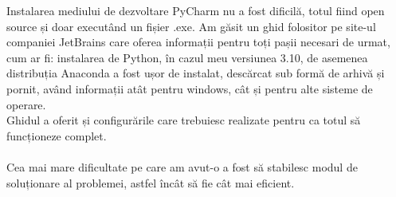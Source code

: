 \documentclass{article}
\begin{document}
Instalarea mediului de dezvoltare PyCharm nu a fost dificilă, totul fiind open source și doar executând un fișier .exe. Am găsit un ghid folositor pe site-ul companiei JetBrains care oferea informații pentru toți pașii necesari de urmat, cum ar fi: instalarea de Python, în cazul meu versiunea 3.10, de asemenea distribuția Anaconda a fost ușor de instalat, descărcat sub formă de arhivă și pornit, având informații atât pentru windows, cât și pentru alte sisteme de operare.\\ 
Ghidul a oferit și configurările care trebuiesc realizate pentru ca totul să funcționeze complet.\\\\
Cea mai mare dificultate pe care am avut-o a fost să stabilesc modul de soluționare al problemei, astfel încât să fie cât mai eficient.
\end{document}
